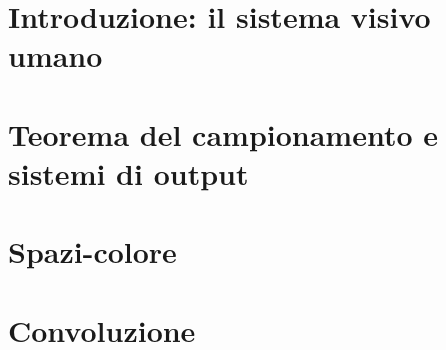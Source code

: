 \documentclass{article}
\begin{document}


\tableofcontents
\restoregeometry

\section{Introduzione: il sistema visivo umano}


\section{Teorema del campionamento e sistemi di output}


\section{Spazi-colore}


\section{Convoluzione}

\end{document}

